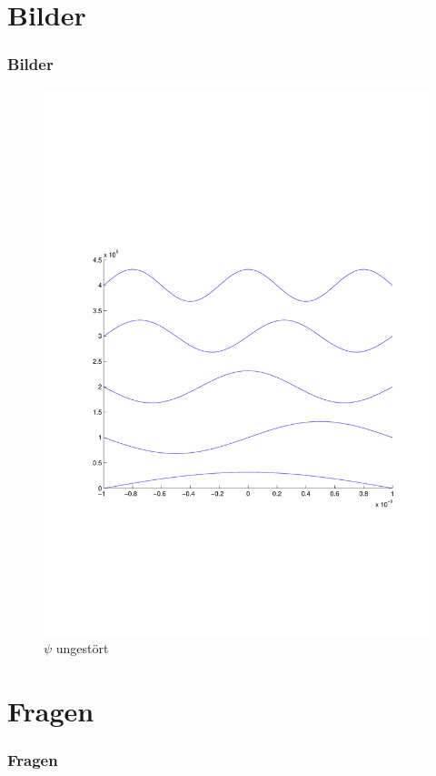 \documentclass[aspectratio=169]{beamer}
\begin{document}
\section{ Bilder }
\begin{frame}
  \frametitle{ Bilder }
  \begin{figure}
    \centering
    \includegraphics[width=12cm]{../../skript/efeld/Psi_ungestoert.pdf}
    \caption{$\psi$ ungest\"ort}
    \label{abb:efeld_psi_ungestoert}
  \end{figure}
\end{frame}



\section{ Fragen }
\begin{frame}
  \frametitle{ Fragen }
\end{frame}
\end{document}
